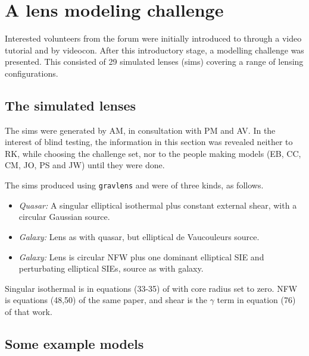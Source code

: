 \section{A lens modeling challenge} \label{sec:results}


Interested volunteers from the \sw forum were initially introduced to
\spl through a video tutorial and by videocon.  After this
introductory stage, a modelling challenge was presented.  This
consisted of 29 simulated lenses (sims) covering a range of lensing
configurations.

\subsection{The simulated lenses} \label{sec:sims}

The sims were generated by AM, in consultation with PM and AV.  In the
interest of blind testing, the information in this section was
revealed neither to RK, while choosing the challenge set, nor to the
people making models (EB, CC, CM, JO, PS and JW) until they were done.

The sims produced using {\tt gravlens}
\citep{2001astro.ph..2341K,2001astro.ph..2340K} and were of three
kinds, as follows.

\begin{itemize}
  \item {\em Quasar:\/} A singular elliptical isothermal plus constant
    external shear, with a circular Gaussian source.
  \item {\em Galaxy:\/} Lens as with quasar, but elliptical de
    Vaucouleurs source.
  \item {\em Galaxy:\/} Lens is circular NFW plus one dominant
    elliptical SIE and perturbating elliptical SIEs, source as with
    galaxy.
\end{itemize}

Singular isothermal is in equations (33-35) of
\cite{2001astro.ph..2341K} with core radius set to zero. NFW is
equations (48,50) of the same paper, and shear is the $\gamma$ term in
equation (76) of that work.

\subsection{Some example models}

